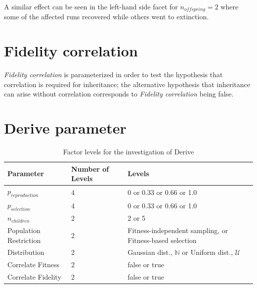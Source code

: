 A similar effect can be seen in the left-hand side facet for $n_{offspring} = 2$ where some of the affected runs recovered while others went to extinction.

\section{Fidelity correlation}

\emph{Fidelity correlation} is parameterized in order to test the hypothesis that correlation is required for inheritance; the alternative hypothesis that inheritance can arise without correlation corresponds to \emph{Fidelity correlation} being false.

\section{Derive parameter}\label{screening-distribution}


\begin{table} %
	\begin{center}
		\caption{Factor levels for the investigation of Derive}
		\begin{tabular}{@{}llp{6cm}@{}}
			\toprule
			Parameter              & Number of Levels & Levels                                                       \\
			\midrule
			$p_{reproduction}$     & 4                & 0 or 0.33 or 0.66 or 1.0                                     \\
			$p_{selection}$        & 4                & 0 or 0.33 or 0.66 or 1.0                                     \\
			$n_{children}$         & 2                & 2 or 5                                                       \\
			Population Restriction & 2                & Fitness-independent sampling, or Fitness-based selection     \\
			Distribution           & 2                & Gaussian dist., $\mathbb{N}$ or Uniform dist., $\mathcal{U}$ \\
			Correlate Fitness      & 2                & false or true                                                \\
			Correlate Fidelity     & 2                & false or true                                                \\
			\bottomrule
		\end{tabular}
	\end{center}
\end{table}

